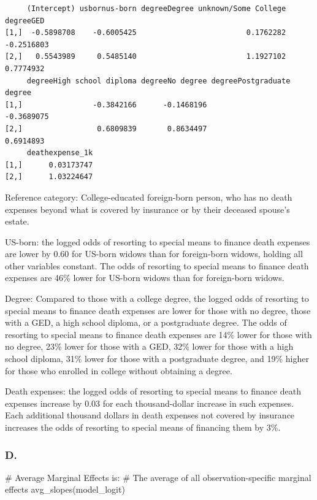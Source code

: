 \documentclass[
  letterpaper,
  DIV=11,
  numbers=noendperiod]{scrartcl}
\newenvironment{Shaded}{\begin{snugshade}}{\end{snugshade}}
\newcommand{\CommentTok}[1]{\textcolor[rgb]{0.37,0.37,0.37}{#1}}
\newcommand{\FunctionTok}[1]{\textcolor[rgb]{0.28,0.35,0.67}{#1}}
\newcommand{\NormalTok}[1]{\textcolor[rgb]{0.00,0.23,0.31}{#1}}
\begin{document}
\begin{verbatim}
     (Intercept) usbornus-born degreeDegree unknown/Some College  degreeGED
[1,]  -0.5898708    -0.6005425                         0.1762282 -0.2516803
[2,]   0.5543989     0.5485140                         1.1927102  0.7774932
     degreeHigh school diploma degreeNo degree degreePostgraduate degree
[1,]                -0.3842166      -0.1468196                -0.3689075
[2,]                 0.6809839       0.8634497                 0.6914893
     deathexpense_1k
[1,]      0.03173747
[2,]      1.03224647
\end{verbatim}

Reference category: College-educated foreign-born person, who has no
death expenses beyond what is covered by insurance or by their deceased
spouse's estate.

US-born: the logged odds of resorting to special means to finance death
expenses are lower by 0.60 for US-born widows than for foreign-born
widows, holding all other variables constant. The odds of resorting to
special means to finance death expenses are 46\% lower for US-born
widows than for foreign-born widows.

Degree: Compared to those with a college degree, the logged odds of
resorting to special means to finance death expenses are lower for those
with no degree, those with a GED, a high school diploma, or a
postgraduate degree. The odds of resorting to special means to finance
death expenses are 14\% lower for those with no degree, 23\% lower for
those with a GED, 32\% lower for those with a high school diploma, 31\%
lower for those with a postgraduate degree, and 19\% higher for those
who enrolled in college without obtaining a degree.

Death expenses: the logged odds of resorting to special means to finance
death expenses increase by 0.03 for each thousand-dollar increase in
such expenses. Each additional thousand dollars in death expenses not
covered by insurance increases the odds of resorting to special means of
financing them by 3\%.

\subsubsection{D.}\label{d.}

\begin{Shaded}
\begin{Highlighting}[]
\CommentTok{\# Average Marginal Effects is:}
\CommentTok{\# The average of all observation{-}specific marginal effects}
\FunctionTok{avg\_slopes}\NormalTok{(model\_logit)}
\end{Highlighting}
\end{Shaded}
\end{document}
